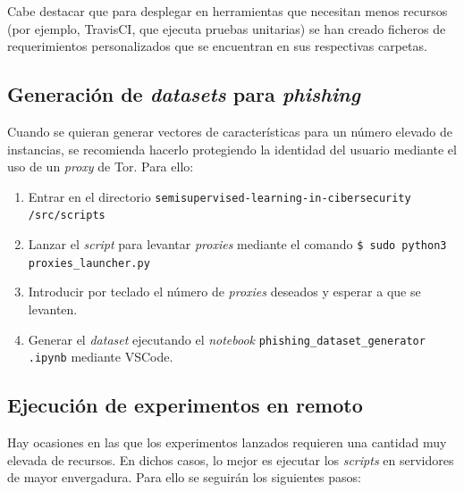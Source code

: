 Cabe destacar que para desplegar en herramientas que necesitan menos recursos (por ejemplo, TravisCI, que ejecuta pruebas unitarias) se han creado ficheros de requerimientos personalizados que se encuentran en sus respectivas carpetas.


\subsection{Generación de \textit{datasets} para \textit{phishing}}

Cuando se quieran generar vectores de características para un número elevado de instancias, se recomienda hacerlo protegiendo la identidad del usuario mediante el uso de un \textit{proxy} de Tor. Para ello:

\begin{enumerate}
	\item Entrar en el directorio \texttt{semisupervised-learning-in-cibersecurity /src/scripts}
	\item Lanzar el \textit{script} para levantar \textit{proxies} mediante el comando \texttt{\$ sudo python3 proxies\_launcher.py}
	\item Introducir por teclado el número de \textit{proxies} deseados y esperar a que se levanten.
	\item Generar el \textit{dataset} ejecutando el \textit{notebook} \texttt{phishing\_dataset\_generator .ipynb} mediante VSCode.
\end{enumerate}

\subsection{Ejecución de experimentos en remoto}

Hay ocasiones en las que los experimentos lanzados requieren una cantidad muy elevada de recursos. En dichos casos, lo mejor es ejecutar los \textit{scripts} en servidores de mayor envergadura. Para ello se seguirán los siguientes pasos:

